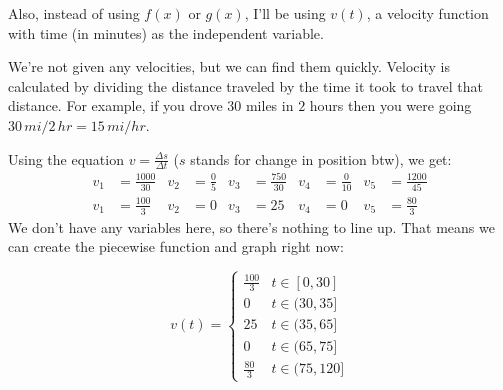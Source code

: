 Also, instead of using $f(x)$ or $g(x)$, I'll be using $v(t)$, a velocity function with time (in minutes) as the independent variable.

We're not given any velocities, but we can find them quickly. Velocity is calculated by dividing the distance traveled by the time it took to travel that distance. For example, if you drove $30$ miles in $2$ hours then you were going $30\,mi / 2\,hr = 15\,mi/hr$. 

Using the equation $v = \frac{\Delta s}{\Delta t}$ ($s$ stands for change in position btw), we get:
\begin{align*}
    v_1 &= \frac{1000}{30} &
    v_2 &= \frac{0}{5} &
    v_3 &= \frac{750}{30} &
    v_4 &= \frac{0}{10} & 
    v_5 &= \frac{1200}{45} \\
    v_1 &= \frac{100}{3} &
    v_2 &= 0 &
    v_3 &= 25 &
    v_4 &= 0 &
    v_5 &= \frac{80}{3}
\end{align*}
\clearpage
We don't have any variables here, so there's nothing to line up. That means we can create the piecewise function and graph right now:
\begin{center}
    \begin{minipage}[c]{0.48\linewidth}
        \[
            v(t) = 
            \begin{cases}
            \frac{100}{3} & t \in [0, 30] \\
            0 & t \in (30, 35] \\
            25 & t \in (35, 65] \\
            0 & t \in (65, 75] \\
            \frac{80}{3} & t \in (75, 120]
            \end{cases}
        \]
    \end{minipage}
    \begin{minipage}[c]{0.48\textwidth}
        \centering
    \end{minipage}
\end{center}
